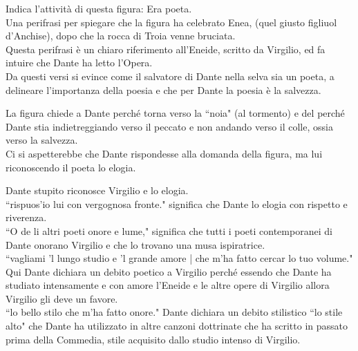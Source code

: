 \documentclass{article}
\begin{document}
Indica l'attività di questa figura: Era poeta.\\
Una perifrasi per spiegare che la figura ha celebrato Enea, (quel giusto figliuol d'Anchise), dopo che la rocca di Troia venne bruciata.\\
Questa perifrasi è un chiaro riferimento all'Eneide, scritto da Virgilio, ed fa intuire che Dante ha letto l'Opera.\\
Da questi versi si evince come il salvatore di Dante nella selva sia un poeta, a delineare l'importanza della poesia e che per Dante la poesia è la salvezza.


La figura chiede a Dante perché torna verso la ``noia" (al tormento) e del perché Dante stia indietreggiando verso il peccato e non andando verso il colle, ossia verso la salvezza.\\
Ci si aspetterebbe che Dante rispondesse alla domanda della figura, ma lui riconoscendo il poeta lo elogia.


Dante stupito riconosce Virgilio e lo elogia.\\
``rispuos'io lui con vergognosa fronte." significa che Dante lo elogia con rispetto e riverenza.\\
``O de li altri poeti onore e lume," significa che tutti i poeti contemporanei di Dante onorano Virgilio e che lo trovano una musa ispiratrice.\\
``vagliami 'l lungo studio e 'l grande amore | che m'ha fatto cercar lo tuo volume." Qui Dante dichiara un debito poetico a Virgilio perché essendo che Dante ha studiato intensamente e con amore l'Eneide e le altre opere di Virgilio allora Virgilio gli deve un favore.\\
``lo bello stilo che m'ha fatto onore." Dante dichiara un debito stilistico ``lo stile alto" che Dante ha utilizzato in altre canzoni dottrinate che ha scritto in passato prima della Commedia, stile acquisito dallo studio intenso di Virgilio.
\end{document}
